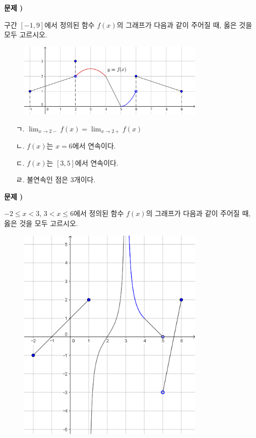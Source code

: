 \documentclass{oblivoir}
\newcounter{num}
\newcommand\prob[1]
{\bigskip\par\noindent\stepcounter{num} \textbf{문제 \thenum) #1}\par\noindent}
\begin{document}
%
\prob{}
구간 \([-1,9]\)에서 정의된 함수 \(f(x)\)의 그래프가 다음과 같이 주어질 때, 옳은 것을 모두 고르시오.
\vspace{-10pt}
\begin{figure}[h!]
\centering
\includegraphics[width=0.8\textwidth]{prob_4}
\end{figure}

\vspace{-10pt}
\begin{enumerate}
\item[ㄱ.]
\(\displaystyle\lim_{x\to2-}f(x)=\lim_{x\to2+}f(x)\)
\item[ㄴ.]
\(f(x)\)는 \(x=6\)에서 연속이다.
\item[ㄷ.]
\(f(x)\)는 \([3,5]\)에서 연속이다.
\item[ㄹ.]
불연속인 점은 \(3\)개이다.
\end{enumerate}

%
\prob{}
\(-2\le x<3\), \(3<x\le 6\)에서 정의된 함수 \(f(x)\)의 그래프가 다음과 같이 주어질 때, 옳은 것을 모두 고르시오.
\begin{figure}[h!]
\centering
\includegraphics[width=0.8\textwidth]{prob_5}
\end{figure}
\end{document}
